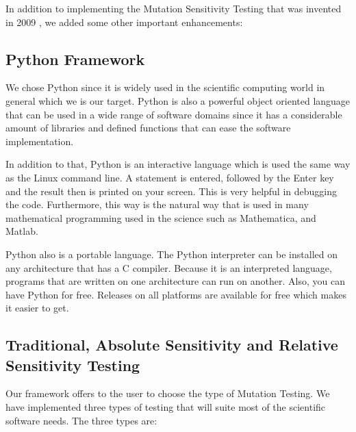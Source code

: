\documentclass{acm_proc_article-sp}
\begin{document}
In addition to implementing the Mutation Sensitivity Testing that was invented in 2009 \cite{a2}, we added some other important enhancements:
\subsection{Python Framework}

We chose Python since it is widely used in the scientific computing world in general which we is our target. Python is also a powerful object oriented language that can be used in a wide range of software domains since it has a considerable amount of libraries and defined functions that can ease the software implementation.

In addition to that, Python is an interactive language which is used the same way as the Linux command line. A statement is entered, followed by the Enter key and the result then is printed on your screen. This is very helpful in debugging the code. Furthermore, this way is the natural way that is used in many mathematical programming used in the science such as Mathematica, and Matlab.\cite{a1}

Python also is a portable language. The Python interpreter can be installed on any architecture that has a C compiler. Because it is an interpreted language, programs that are written on one architecture can run on another. Also, you can have Python for free. Releases on all platforms are available for free which makes it easier to get.

\subsection{Traditional, Absolute Sensitivity and Relative Sensitivity Testing}
Our framework offers to the user to choose the type of Mutation Testing. We have implemented three types of testing that will suite most of the scientific software needs. The three types are:
\end{document}
